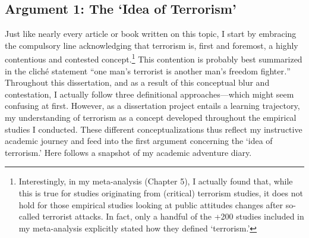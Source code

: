 \subsection{Argument 1: The `Idea of Terrorism'}
\label{sec:121}
Just like nearly every article or book written on this topic, I start by embracing the compulsory line acknowledging that terrorism is, first and foremost, a highly contentious and contested concept.\footnote{Interestingly, in my meta-analysis (Chapter 5), I actually found that, while this is true for studies originating from (critical) terrorism studies, it does not hold for those empirical studies looking at public attitudes changes after so-called terrorist attacks. In fact, only a handful of the +200 studies included in my meta-analysis explicitly stated how they defined `terrorism.'} This contention is probably best summarized in the cliché statement ``one man's terrorist is another man's freedom fighter\textit{.}'' Throughout this dissertation, and as a result of this conceptual blur and contestation, I actually follow three definitional approaches---which might seem confusing at first. However, as a dissertation project entails a learning trajectory, my understanding of terrorism as a concept developed throughout the empirical studies I conducted. These different conceptualizations thus reflect my instructive academic journey and feed into the first argument concerning the `idea of terrorism.' Here follows a snapshot of my academic adventure diary.



